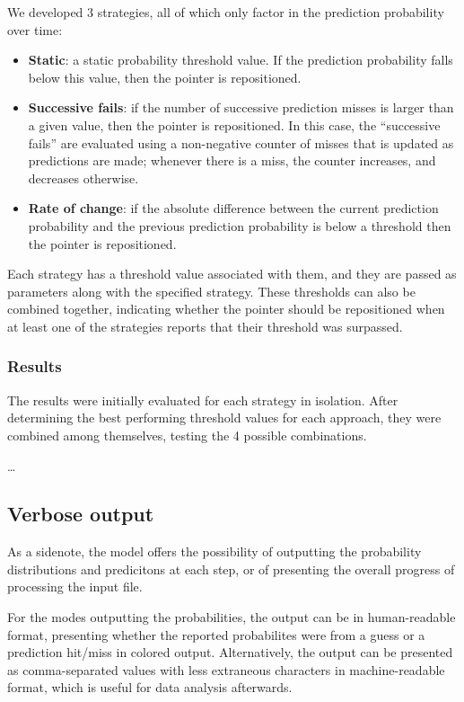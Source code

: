 \documentclass{article}
\begin{document}
We developed 3 strategies, all of which only factor in the prediction probability over time:
\begin{itemize}
    \item \textbf{Static}: a static probability threshold value. If the prediction probability falls below this value, then the pointer is repositioned.
    \item \textbf{Successive fails}: if the number of successive prediction misses is larger than a given value, then the pointer is repositioned.
    In this case, the ``successive fails'' are evaluated using a non-negative counter of misses that is updated as predictions are made; whenever there is a miss, the counter increases, and decreases otherwise.
    \item \textbf{Rate of change}: if the absolute difference between the current prediction probability and the previous prediction probability is below a threshold then the pointer is repositioned.
\end{itemize}

Each strategy has a threshold value associated with them, and they are passed as parameters along with the specified strategy.
These thresholds can also be combined together, indicating whether the pointer should be repositioned when at least one of the strategies reports that their threshold was surpassed.

\subsubsection{Results}

The results were initially evaluated for each strategy in isolation.
After determining the best performing threshold values for each approach, they were combined among themselves, testing the 4 possible combinations.

\dots

\subsection{Verbose output}
\label{sec:copy-model-verbose}

As a sidenote, the model offers the possibility of outputting the probability distributions and predicitons at each step, or of presenting the overall progress of processing the input file.

For the modes outputting the probabilities, the output can be in human-readable format, presenting whether the reported probabilites were from a guess or a prediction hit/miss in colored output.
Alternatively, the output can be presented as comma-separated values with less extraneous characters in machine-readable format, which is useful for data analysis afterwards.
\end{document}
